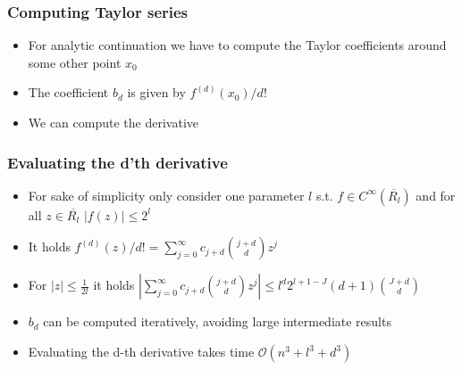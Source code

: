 \begin{frame}[<+->]
\frametitle{Computing Taylor series}
\begin{itemize}[<+->]
\item For analytic continuation we have to compute the Taylor coefficients around some other point $x_0$
\item The coefficient $b_d$ is given by $f^{(d)}(x_0)/d!$
\item We can compute the derivative
\end{itemize}
\end{frame}
\begin{frame}
\frametitle{Evaluating the d'th derivative}
\begin{itemize}[<+->]
\item For sake of simplicity only consider one parameter $l$ s.t. $f \in C^\infty(\overline{R_l})$ and for all $z \in \overline{R_l}$ $| f(z) | \leq 2^l$
\item It holds $f^{(d)}(z)/d! = \sum_{j=0}^\infty c_{j+d} {j+d \choose d}z^j$
\item For $|z| \leq \frac{1}{2l}$ it holds $|\sum_{j=0}^\infty c_{j+d} {j+d \choose d}z^j| \leq l^d2^{l+1-J}(d+1){J+d \choose d}$
\item $b_d$ can be computed iteratively, avoiding large intermediate results
\item Evaluating the d-th derivative takes time $\mathcal{O} (n^3+l^3+d^3)$
\end{itemize}
\end{frame}